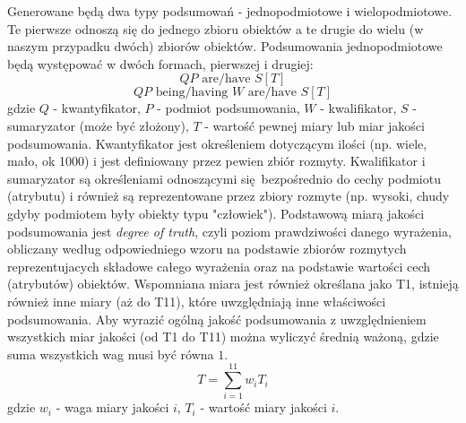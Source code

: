 \documentclass{classrep}
\begin{document}
{        Generowane będą dwa typy podsumowań - jednopodmiotowe i wielopodmiotowe. Te pierwsze odnoszą
        się do jednego zbioru obiektów a te drugie do wielu (w naszym przypadku dwóch) zbiorów obiektów.
        Podsumowania jednopodmiotowe będą występować w dwóch formach, pierwszej i drugiej:
        \begin{equation}
            Q P \textrm{ are/have } S [T]
        \end{equation}
        \begin{equation}
            Q P \textrm{ being/having } W \textrm{ are/have } S [T]
        \end{equation}
        gdzie $Q$ - kwantyfikator, $P$ - podmiot podsumowania, $W$ - kwalifikator, $S$ - sumaryzator
        (może być złożony), $T$ - wartość pewnej miary lub miar jakości podsumowania. Kwantyfikator
        jest określeniem dotyczącym ilości (np. wiele, mało, ok 1000) i jest definiowany przez
        pewien zbiór rozmyty. Kwalifikator i sumaryzator są określeniami odnoszącymi
        się bezpośrednio do cechy podmiotu (atrybutu) i również są reprezentowane przez zbiory
        rozmyte (np. wysoki, chudy gdyby podmiotem były obiekty typu "człowiek"). Podstawową miarą
        jakości podsumowania jest \emph{degree of truth}, czyli poziom prawdziwości danego
        wyrażenia, obliczany według odpowiedniego wzoru na podstawie zbiorów rozmytych
        reprezentujacych składowe całego wyrażenia oraz na podstawie wartości cech (atrybutów)
        obiektów. Wspomniana miara jest również określana jako T1, istnieją również inne miary (aż
        do T11), które uwzględniają inne właściwości podsumowania. Aby wyrazić ogólną jakość
        podsumowania z uwzględnieniem wszystkich miar jakości (od T1 do T11) można wyliczyć średnią
        ważoną, gdzie suma wszystkich wag musi być równa $1$.
        \begin{equation}
            T = \sum_{i=1}^{11} w_i T_i
        \end{equation}
        gdzie $w_i$ - waga miary jakości $i$, $T_i$ - wartość miary jakości $i$.

}
\end{document}
